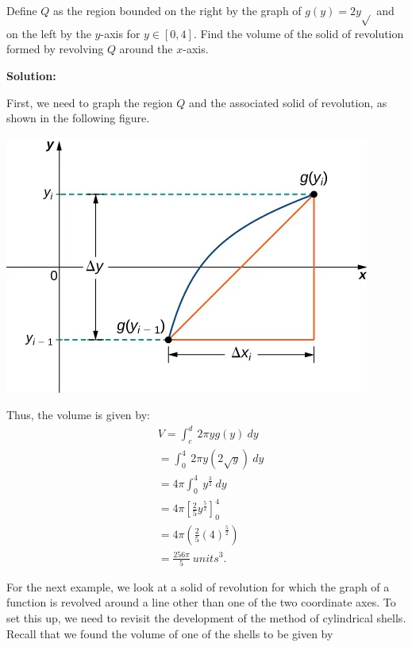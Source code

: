 \documentclass{report}
\begin{document}
  \pagebreak \bigbreak \noindent 
  \begin{eg}
     Define \( Q \) as the region bounded on the right by the graph of \( g(y) = 2y\sqrt{} \) and on the left by the \( y \)-axis for \( y \in [0, 4] \). Find the volume of the solid of revolution formed by revolving \( Q \) around the \( x \)-axis.
  \end{eg}
  \bigbreak \noindent 
  \textbf{Solution:}
  \bigbreak \noindent 
  \begin{minipage}[]{0.47\textwidth}
      First, we need to graph the region $Q$ and the associated solid of revolution, as shown in the following figure.
      \bigbreak \noindent 
      \begin{center}
          \includegraphics[scale=0.4]{./figures/graph30.png}
      \end{center}
  \end{minipage}
  \begin{minipage}[]{0.47\textwidth}
    Thus, the volume is given by:
    \begin{align*}
        &V = \int_{c}^{d}\ 2\pi yg(y)\ dy \\
        &= \int_{0}^{4}\ 2\pi y \left(2\sqrt{y}\right)\ dy \\
        &= 4\pi \int_{0}^{4}\ y^{\frac{3}{2}}\ dy \\
        &= 4\pi \left[\frac{2}{5}y^{\frac{5}{2}}\right]_0^{4}  \\
        &= 4\pi \left(\frac{2}{5}(4)^{\frac{5}{2}}\right) \\
        &=\frac{256\pi}{5}\ units^{3}
    .\end{align*}
  \end{minipage}
  \bigbreak \noindent 
  For the next example, we look at a solid of revolution for which the graph of a function is revolved around a line other than one of the two coordinate axes. To set this up, we need to revisit the development of the method of cylindrical shells. Recall that we found the volume of one of the shells to be given by
\end{document}
